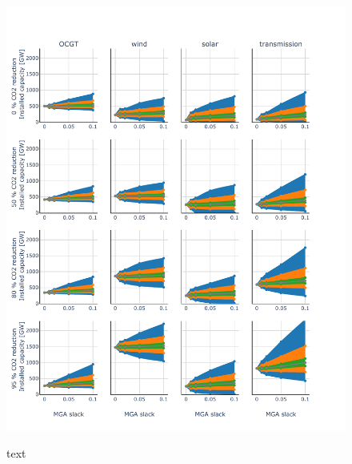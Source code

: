 \begin{figure}[p]\raggedleft
\includegraphics[width=.9\paperwidth,trim={0 0cm 0 0cm},clip]{./Images/Capacaty_vs_cost}
\label{fig:cap_vs_cost}
\caption{text}
\end{figure}
